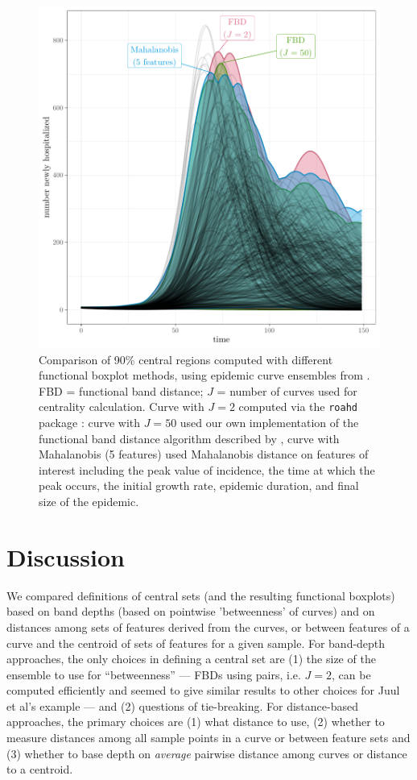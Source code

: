 \documentclass[fleqn,10pt,lineno]{wlpeerj}
\begin{document}
\begin{figure}[ht]\centering
  \includegraphics[width=\linewidth]{scripts/cent_plot.pdf}
  \caption{Comparison of 90\% central regions computed with
    different functional boxplot methods, using epidemic curve ensembles from \juul. FBD = functional band distance; $J$ = number of curves used for centrality calculation. Curve with $J=2$ computed via the \texttt{roahd} package \citep{roahd}: curve with $J=50$ used our own implementation of the functional band distance algorithm described by \juul, curve with Mahalanobis (5 features) used Mahalanobis distance on features of interest including the peak value of incidence, the time at which the peak occurs, the initial growth rate, epidemic duration, and final size of the epidemic.
  }
  \label{p.a}
\end{figure}
 
\section*{Discussion}

We compared definitions of central sets (and the resulting functional boxplots) based on band depths (based on pointwise 'betweenness' of curves) and on distances among sets of features derived from the curves, or between features of a curve and the centroid of sets of features for a given sample. For band-depth approaches, the only choices in defining a central set are (1) the size of the ensemble to use for ``betweenness'' --- FBDs using pairs, i.e. $J=2$, can be computed efficiently and seemed to give similar results to other choices for Juul et al's example --- and (2) questions of tie-breaking. For distance-based approaches, the primary choices are (1) what distance to use, (2) whether to measure distances among all sample points in a curve or between feature sets and (3) whether to base depth on \emph{average} pairwise distance among curves or distance to a centroid.
\end{document}
